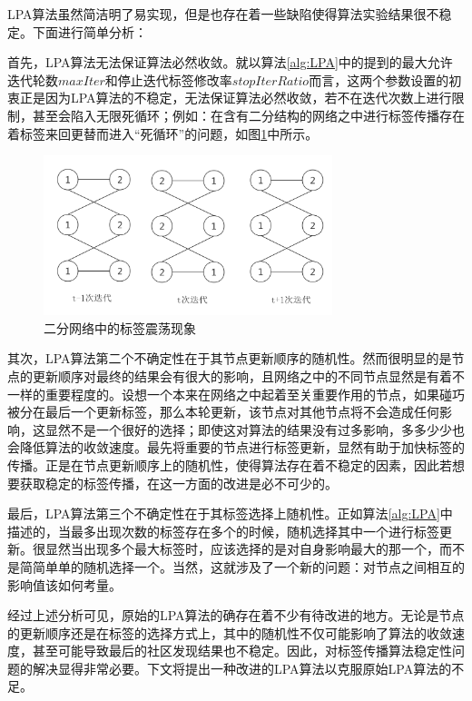 LPA算法虽然简洁明了易实现，但是也存在着一些缺陷使得算法实验结果很不稳定。下面进行简单分析：

首先，LPA算法无法保证算法必然收敛。就以算法\ref{alg:LPA}中的提到的最大允许迭代轮数$maxIter$和停止迭代标签修改率$stopIterRatio$而言，这两个参数设置的初衷正是因为LPA算法的不稳定，无法保证算法必然收敛，若不在迭代次数上进行限制，甚至会陷入无限死循环；例如：在含有二分结构的网络之中进行标签传播存在着标签来回更替而进入“死循环”的问题，如图\ref{fig:fig3-1}中所示。

\begin{figure}
  \centering
  \includegraphics[width=0.75\textwidth]{figures/fig3-1}
  \caption{二分网络中的标签震荡现象}\label{fig:fig3-1}
 \end{figure}

其次，LPA算法第二个不确定性在于其节点更新顺序的随机性。然而很明显的是节点的更新顺序对最终的结果会有很大的影响，且网络之中的不同节点显然是有着不一样的重要程度的。设想一个本来在网络之中起着至关重要作用的节点，如果碰巧被分在最后一个更新标签，那么本轮更新，该节点对其他节点将不会造成任何影响，这显然不是一个很好的选择；即使这对算法的结果没有过多影响，多多少少也会降低算法的收敛速度。最先将重要的节点进行标签更新，显然有助于加快标签的传播。正是在节点更新顺序上的随机性，使得算法存在着不稳定的因素，因此若想要获取稳定的标签传播，在这一方面的改进是必不可少的。

最后，LPA算法第三个不确定性在于其标签选择上随机性。正如算法\ref{alg:LPA}中描述的，当最多出现次数的标签存在多个的时候，随机选择其中一个进行标签更新。很显然当出现多个最大标签时，应该选择的是对自身影响最大的那一个，而不是简简单单的随机选择一个。当然，这就涉及了一个新的问题：对节点之间相互的影响值该如何考量。

经过上述分析可见，原始的LPA算法的确存在着不少有待改进的地方。无论是节点的更新顺序还是在标签的选择方式上，其中的随机性不仅可能影响了算法的收敛速度，甚至可能导致最后的社区发现结果也不稳定。因此，对标签传播算法稳定性问题的解决显得非常必要。下文将提出一种改进的LPA算法以克服原始LPA算法的不足。

